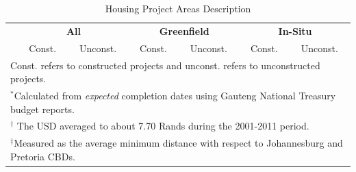 \documentclass[12pt]{article}
\begin{document}
\vspace{0mm}
\begin{table}[h!]
\centering
\caption{Housing Project Areas Description}\label{table:projectdescriptives}
\vspace{0mm}
\begin{tabular}{l*{1}{cccccc}}
\toprule
  & \multicolumn{2}{c}{\textbf{All}}& \multicolumn{2}{c}{\textbf{Greenfield}}  & \multicolumn{2}{c}{\textbf{In-Situ}}   \\
  &Const. & Unconst. &Const. & Unconst.   & Const. & Unconst. \\
\midrule

\bottomrule
\multicolumn{7}{l}{\scriptsize Const. refers to constructed projects and unconst. refers to unconstructed projects.}\\[-.5em]
\multicolumn{7}{l}{\scriptsize $^*$Calculated from {\it expected} completion dates using Gauteng National Treasury budget reports.}\\[-.5em]
\multicolumn{7}{l}{\scriptsize $^\dagger$ The USD averaged to about 7.70 Rands during the 2001-2011 period.}\\[-.5em]
\multicolumn{7}{l}{\scriptsize $^\ddagger$Measured as the average minimum distance with respect to Johannesburg and Pretoria CBDs. } \\[-.5em]
\end{tabular}
\end{table} 
\end{document}
